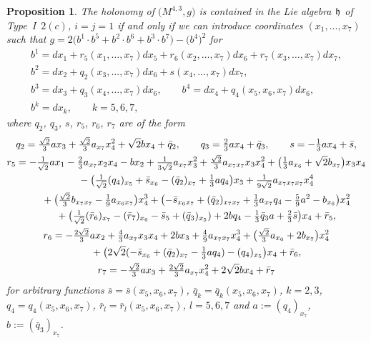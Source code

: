 \documentclass[pdftex]{sigma}
\numberwithin{equation}{section}
\newtheorem{Proposition}[Theorem]{Proposition}
 { \theoremstyle{definition}
\newtheorem{Definition}[Theorem]{Definition}
\newtheorem{Example}[Theorem]{Example}
\newtheorem{Remark}[Theorem]{Remark} }
\newcommand\fh{{\frak h}}
\begin{document}
\begin{Proposition} The holonomy of $\big(M^{4,3},g\big)$ is contained in the Lie algebra $\fh$ of Type~I~$2(c)$, $i=j=1$ if and only if we can introduce coordinates $(x_1,\dots, x_7)$ such that $g=2\big(b^1\cdot b^5+b^2\cdot b^6+b^3\cdot b^7\big)- \big(b^4\big)^2$ for
\begin{gather*}
b^1= dx_1 + r_5(x_1,\dots, x_7)dx_5+r_6(x_2,\dots,x_7)dx_6+r_7(x_3,\dots,x_7)dx_7, \\
b^2= dx_2+q_2(x_3,\dots,x_7)dx_6 +s(x_4,\dots,x_7)dx_7, \\
b^3= dx_3+q_3(x_4,\dots,x_7) dx_6, \qquad
b^4= dx_4+q_4(x_5,x_6,x_7)dx_6, \\
b^k= dx_k,\qquad k=5,6,7 ,
\end{gather*}
where $q_2$, $q_3$, $s$, $r_5$, $r_6$, $r_7$ are of the form
\begin{gather*}
q_2 = \tfrac {\sqrt2} 3ax_3+\tfrac {\sqrt2} 3 a_{ x_7}x_4^2 +\sqrt2 b x_4+\bar q_2,\qquad
q_3 = \tfrac 23 a x_4+\bar q_3,\qquad
s = -\tfrac13 a x_4+\bar s, \\
r_5 = -\tfrac 1{\sqrt 2} a x_1 -\tfrac 23 a_{x_7} x_2 x_4 -b x_2 +\tfrac 1{3\sqrt2} a_{x_7} x_3^2 +\tfrac{\sqrt2}3 a_{x_7 x_7 }x_3 x_4^2+\big( \tfrac13 a_{x_6} +\sqrt2 b_{x_7}\big) x_3 x_4 \\
\hphantom{r_5 =}{} -\big( \tfrac1{\sqrt2} (q_4)_{x_5} + \bar s_{x_6} - (\bar q_2)_{x_7} +\tfrac13 a q_4\big) x_3 +\tfrac1{9\sqrt2} a_{x_7 x_7 x_7} x_4^4 \\
\hphantom{r_5 =}{}+\big(\tfrac{\sqrt2}3 b_{x_7 x_7}-\tfrac19 a_{x_6 x_7}\big) x_4^3 +\big( {-}\bar s_{x_6 x_7}+(\bar q_2)_{x_7 x_7} +\tfrac13 a_{x_7}q_4 -\tfrac59 a^2 -b_{x_6}\big) x_4^2 \\
\hphantom{r_5 =}{} +\big( \tfrac1{\sqrt2} (\bar r_6)_{x_7}-(\bar r_7)_{x_6} -\bar s_5 +(\bar q_3)_{x_5}) +2b q_4 -\tfrac13 \bar q_3 a +\tfrac23 \bar s\big) x_4 +\bar r_5,\\
r_6=-\tfrac{2\sqrt2}3 a x_2 +\tfrac43 a_{x_7} x_3 x_4 +2b x_3 +\tfrac49 a_{x_7 x_7} x_4^3 +\big(\tfrac{\sqrt2}3 a_{x_6} +2b_{x_7}\big) x_4^2 \\
\hphantom{r_6=}{}+\big( 2\sqrt2 (-\bar s_{x_6} +(\bar q_2)_{x_7}-\tfrac13 a q_4) -(q_4)_{x_5}\big) x_4 + \bar r_6,\\
r_7=-\tfrac{\sqrt2}3 a x_3 +\tfrac{2\sqrt2}3 a_{x_7} x_4^2 +2\sqrt2 b x_4 +\bar r_7
\end{gather*}
for arbitrary functions $\bar s=\bar s(x_5,x_6,x_7)$, $\bar q_k=\bar q_k(x_5,x_6,x_7)$, $k=2,3$, $q_4=q_4(x_5,x_6,x_7)$, $\bar r_l=\bar r_l(x_5,x_6,x_7)$, $l=5,6,7$ and $a:= (q_4)_{x_7}$, $b:= (\bar q_3)_{x_7}$.
\end{Proposition}
\end{document}
